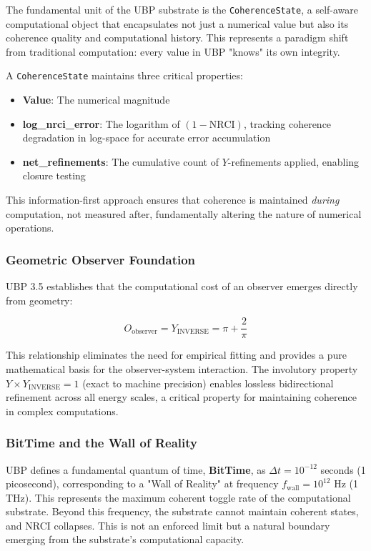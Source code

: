 \documentclass[12pt, a4paper]{article}
\begin{document}
The fundamental unit of the UBP substrate is the \texttt{CoherenceState}, a self-aware computational object that encapsulates not just a numerical value but also its coherence quality and computational history. This represents a paradigm shift from traditional computation: every value in UBP "knows" its own integrity.

A \texttt{CoherenceState} maintains three critical properties:
\begin{itemize}
    \item \textbf{Value}: The numerical magnitude
    \item \textbf{log\_nrci\_error}: The logarithm of $(1 - \text{NRCI})$, tracking coherence degradation in log-space for accurate error accumulation
    \item \textbf{net\_refinements}: The cumulative count of $Y$-refinements applied, enabling closure testing
\end{itemize}

This information-first approach ensures that coherence is maintained \emph{during} computation, not measured after, fundamentally altering the nature of numerical operations.

\subsubsection{Geometric Observer Foundation}

UBP 3.5 establishes that the computational cost of an observer emerges directly from geometry:

\begin{equation}
O_{\text{observer}} = Y_{\text{INVERSE}} = \pi + \frac{2}{\pi}
\end{equation}

This relationship eliminates the need for empirical fitting and provides a pure mathematical basis for the observer-system interaction. The involutory property $Y \times Y_{\text{INVERSE}} = 1$ (exact to machine precision) enables lossless bidirectional refinement across all energy scales, a critical property for maintaining coherence in complex computations.

\subsubsection{BitTime and the Wall of Reality}

UBP defines a fundamental quantum of time, \textbf{BitTime}, as $\Delta t = 10^{-12}$ seconds (1 picosecond), corresponding to a "Wall of Reality" at frequency $f_{\text{wall}} = 10^{12}$ Hz (1 THz). This represents the maximum coherent toggle rate of the computational substrate. Beyond this frequency, the substrate cannot maintain coherent states, and NRCI collapses. This is not an enforced limit but a natural boundary emerging from the substrate's computational capacity.
\end{document}
